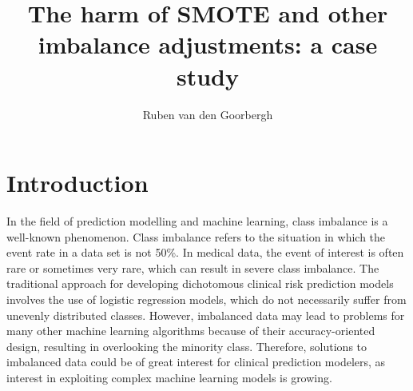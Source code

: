 \documentclass[AMA,STIX1COL, table]{WileyNJD-v2}
\begin{document}
\title{The harm of SMOTE and other imbalance adjustments: a case study}

\author{Ruben van den Goorbergh}










\maketitle



\section{Introduction}
In the field of prediction modelling and machine learning, class imbalance is a well-known phenomenon.\cite{He&Garcia2009} Class imbalance refers to the situation in which the event rate in a data set is not 50\%. \cite{He&Garcia2009} In medical data, the event of interest is often rare or sometimes very rare, which can result in severe class imbalance. The traditional approach for developing dichotomous clinical risk prediction models involves the use of logistic regression models\cite{Christdoulou2019}, which do not necessarily suffer from unevenly distributed classes.\cite{Oommen2011} However, imbalanced data may lead to problems for many other machine learning algorithms because of their accuracy-oriented design, resulting in overlooking the minority class.\cite{Fernandez2018} Therefore, solutions to imbalanced data could be of great interest for clinical prediction modelers, as interest in exploiting complex machine learning models is growing.\cite{Christdoulou2019}
\end{document}
